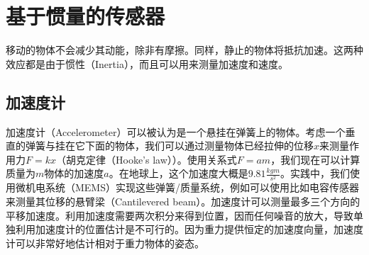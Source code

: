 \section{基于惯量的传感器}
移动的物体不会减少其动能，除非有摩擦。同样，静止的物体将抵抗加速。这两种效应都是由于惯性（Inertia），而且可以用来测量加速度和速度。


\subsection{加速度计}
加速度计（Accelerometer）可以被认为是一个悬挂在弹簧上的物体。考虑一个垂直的弹簧与挂在它下面的物体，我们可以通过测量物体已经拉伸的位移$x$来测量作用力$F=kx$（胡克定律（Hooke's law））。使用关系式$F=am$，我们现在可以计算质量为$m$物体的加速度$a$。在地球上，这个加速度大概是$9.81\frac{kgm}{s^2}$。实践中，我们使用微机电系统（MEMS）实现这些弹簧/质量系统，例如可以使用比如电容传感器来测量其位移的悬臂梁（Cantilevered beam）。加速度计可以测量最多三个方向的平移加速度。利用加速度需要两次积分来得到位置，因而任何噪音的放大，导致单独利用加速度计的位置估计是不可行的。因为重力提供恒定的加速度向量，加速度计可以非常好地估计相对于重力物体的姿态。



